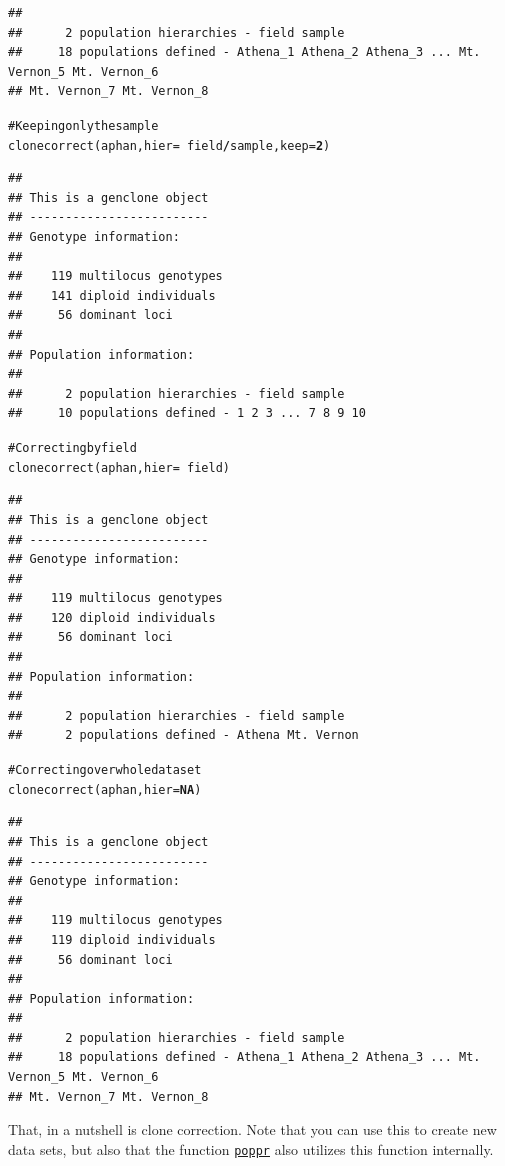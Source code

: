 \documentclass[letterpaper]{article}\usepackage[]{graphicx}\usepackage[]{color}
\makeatletter
\newcommand{\hlnum}[1]{\textcolor[rgb]{0.502,0,0.502}{\textbf{#1}}}%
\newcommand{\hlcom}[1]{\textcolor[rgb]{1,0.502,0}{#1}}%
\newcommand{\hlopt}[1]{\textcolor[rgb]{1,0,0.502}{\textbf{#1}}}%
\newcommand{\hlstd}[1]{\textcolor[rgb]{0,0,0}{#1}}%
\newcommand{\hlkwc}[1]{\textcolor[rgb]{0,0.502,0.753}{#1}}%
\newcommand{\hlkwd}[1]{\textcolor[rgb]{0,0.267,0.4}{#1}}%
\newenvironment{kframe}{%
 \def\at@end@of@kframe{}%
 \ifinner\ifhmode%
  \def\at@end@of@kframe{\end{minipage}}%
  \begin{minipage}{\columnwidth}%
 \fi\fi%
 \def\FrameCommand##1{\hskip\@totalleftmargin \hskip-\fboxsep
 \colorbox{shadecolor}{##1}\hskip-\fboxsep
     \hskip-\linewidth \hskip-\@totalleftmargin \hskip\columnwidth}%
 \MakeFramed {\advance\hsize-\width
   \@totalleftmargin\z@ \linewidth\hsize
   \@setminipage}}%
 {\par\unskip\endMakeFramed%
 \at@end@of@kframe}
\newenvironment{knitrout}{}{} %
\newcommand{\cmdlink}[2]{
  \texttt{\hyperref[#1]{#2}}
}
\makeatother
\begin{document}
\begin{knitrout}
\begin{kframe}
\begin{verbatim}
## 
##      2 population hierarchies - field sample
##     18 populations defined - Athena_1 Athena_2 Athena_3 ... Mt. Vernon_5 Mt. Vernon_6 
## Mt. Vernon_7 Mt. Vernon_8
\end{verbatim}
\begin{alltt}
\hlcom{# Keeping only the sample}
\hlkwd{clonecorrect}\hlstd{(aphan,} \hlkwc{hier} \hlstd{=} \hlopt{~}\hlstd{field}\hlopt{/}\hlstd{sample,} \hlkwc{keep} \hlstd{=} \hlnum{2}\hlstd{)}
\end{alltt}
\begin{verbatim}
## 
## This is a genclone object
## -------------------------
## Genotype information:
## 
##    119 multilocus genotypes
##    141 diploid individuals
##     56 dominant loci
## 
## Population information:
## 
##      2 population hierarchies - field sample
##     10 populations defined - 1 2 3 ... 7 8 9 10
\end{verbatim}
\begin{alltt}
\hlcom{# Correcting by field}
\hlkwd{clonecorrect}\hlstd{(aphan,} \hlkwc{hier} \hlstd{=} \hlopt{~}\hlstd{field)}
\end{alltt}
\begin{verbatim}
## 
## This is a genclone object
## -------------------------
## Genotype information:
## 
##    119 multilocus genotypes
##    120 diploid individuals
##     56 dominant loci
## 
## Population information:
## 
##      2 population hierarchies - field sample
##      2 populations defined - Athena Mt. Vernon
\end{verbatim}
\begin{alltt}
\hlcom{# Correcting over whole data set}
\hlkwd{clonecorrect}\hlstd{(aphan,} \hlkwc{hier} \hlstd{=} \hlnum{NA}\hlstd{)}
\end{alltt}
\begin{verbatim}
## 
## This is a genclone object
## -------------------------
## Genotype information:
## 
##    119 multilocus genotypes
##    119 diploid individuals
##     56 dominant loci
## 
## Population information:
## 
##      2 population hierarchies - field sample
##     18 populations defined - Athena_1 Athena_2 Athena_3 ... Mt. Vernon_5 Mt. Vernon_6 
## Mt. Vernon_7 Mt. Vernon_8
\end{verbatim}
\end{kframe}
\end{knitrout}

\noindent
That, in a nutshell is clone correction. Note that you can use this to create 
new data sets, but also that the function \cmdlink{summary:poppr}{poppr} also
utilizes this function internally. 
\end{document}
